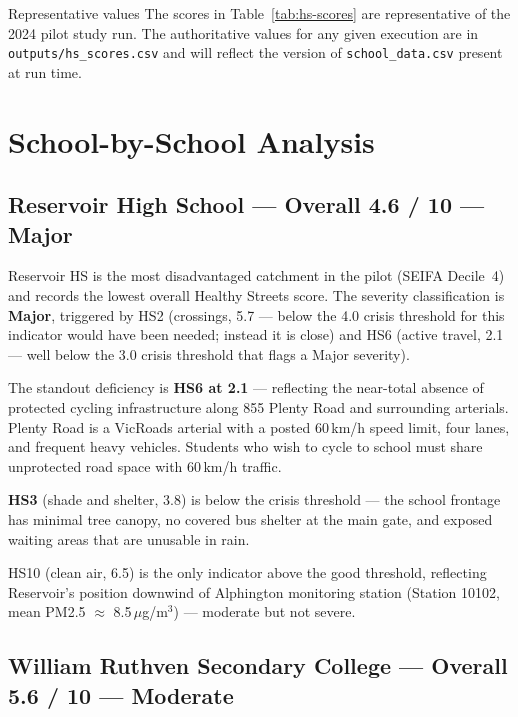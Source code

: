 \documentclass[11pt,a4paper,openany]{book}
\begin{document}
\begin{warnbox}{Representative values}
The scores in Table~\ref{tab:hs-scores} are representative of the 2024 pilot study run.
The authoritative values for any given execution are in
\texttt{outputs/hs\_scores.csv} and will reflect the version of \texttt{school\_data.csv}
present at run time.
\end{warnbox}

\section{School-by-School Analysis}

\subsection{Reservoir High School --- Overall 4.6 / 10 --- Major}

Reservoir HS is the most disadvantaged catchment in the pilot (SEIFA Decile~4) and
records the lowest overall Healthy Streets score.  The severity classification is
\textbf{Major}, triggered by HS2 (crossings, 5.7 --- below the 4.0 crisis threshold
for this indicator would have been needed; instead it is close) and HS6
(active travel, 2.1 --- well below the 3.0 crisis threshold that flags a Major
severity).

The standout deficiency is \textbf{HS6 at 2.1} --- reflecting the near-total absence
of protected cycling infrastructure along 855 Plenty Road and surrounding arterials.
Plenty Road is a VicRoads arterial with a posted 60\,km/h speed limit, four lanes, and
frequent heavy vehicles.  Students who wish to cycle to school must share unprotected
road space with 60\,km/h traffic.

\textbf{HS3} (shade and shelter, 3.8) is below the crisis threshold --- the school
frontage has minimal tree canopy, no covered bus shelter at the main gate, and exposed
waiting areas that are unusable in rain.

HS10 (clean air, 6.5) is the only indicator above the good threshold, reflecting
Reservoir's position downwind of Alphington monitoring station
(Station 10102, mean PM2.5 $\approx$ 8.5\,$\mu$g/m$^3$) --- moderate but not severe.

\subsection{William Ruthven Secondary College --- Overall 5.6 / 10 --- Moderate}
\end{document}
